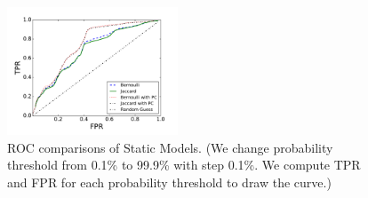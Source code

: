 \begin{figure}[t!]
\begin{center}
\includegraphics[width=2in]{figure/predict}
\vspace{-0.1in}
\caption{ROC comparisons of Static Models. 
(We change probability threshold from 0.1\% to 99.9\% with step 0.1\%. 
We compute TPR and FPR for each probability threshold to draw the curve.)
}
\label{fig:predict}
\end{center}
\vspace{-0.1in}
\end{figure}